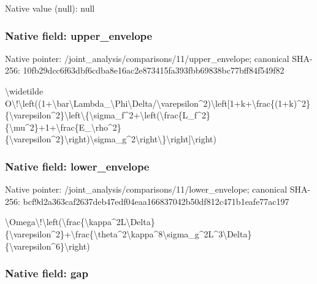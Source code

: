 \documentclass[10pt,a4paper]{article}
\begin{document}
Native value (null): null



\subsubsection{Native field: upper\_envelope}


Native pointer: /joint\_analysis/comparis\allowbreak{}ons/11/upper\_envelope; canonical SHA-256: 10fb29dcc6f63dbf6cdba8e1\allowbreak{}6ac2e873415fa393fbb69838\allowbreak{}bc77bff84f549f82


\textbackslash{}widetilde O\textbackslash{}!\textbackslash{}left((1+\textbackslash{}bar\textbackslash{}Lambda\_\allowbreak{}\textbackslash{}Phi\textbackslash{}Delta/\textbackslash{}varepsilon\textasciicircum{}2\allowbreak{})\textbackslash{}left[1+k+\textbackslash{}frac\{(1+k)\textasciicircum{}2\allowbreak{}\}\{\textbackslash{}varepsilon\textasciicircum{}2\}\textbackslash{}left\textbackslash{}\{\textbackslash{}\allowbreak{}sigma\_f\textasciicircum{}2+\textbackslash{}left(\textbackslash{}frac\{L\_\allowbreak{}f\textasciicircum{}2\}\{\textbackslash{}mu\textasciicircum{}2\}+1+\textbackslash{}frac\{E\_\textbackslash{}r\allowbreak{}ho\textasciicircum{}2\}\{\textbackslash{}varepsilon\textasciicircum{}2\}\textbackslash{}rig\allowbreak{}ht)\textbackslash{}sigma\_g\textasciicircum{}2\textbackslash{}right\textbackslash{}\}\textbackslash{}ri\allowbreak{}ght]\textbackslash{}right)


\subsubsection{Native field: lower\_envelope}


Native pointer: /joint\_analysis/comparis\allowbreak{}ons/11/lower\_envelope; canonical SHA-256: bcf9d2a363caf2637deb47ed\allowbreak{}f04eaa166837042b50df812c\allowbreak{}471b1eafe77ac197


\textbackslash{}Omega\textbackslash{}!\textbackslash{}left(\textbackslash{}frac\{\textbackslash{}kap\allowbreak{}pa\textasciicircum{}2L\textbackslash{}Delta\}\{\textbackslash{}varepsilon\allowbreak{}\textasciicircum{}2\}+\textbackslash{}frac\{\textbackslash{}theta\textasciicircum{}2\textbackslash{}kappa\allowbreak{}\textasciicircum{}8\textbackslash{}sigma\_g\textasciicircum{}2L\textasciicircum{}3\textbackslash{}Delta\}\{\textbackslash{}\allowbreak{}varepsilon\textasciicircum{}6\}\textbackslash{}right)


\subsubsection{Native field: gap}
\end{document}
